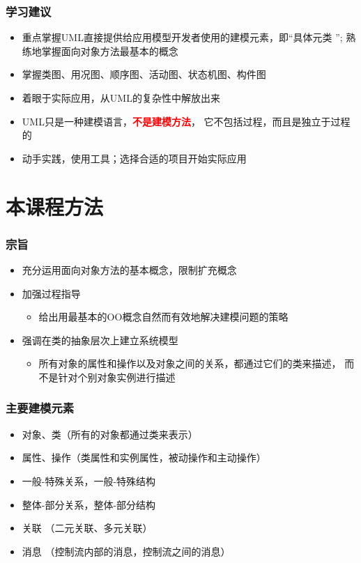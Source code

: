 \documentclass[compress]{beamer}
\begin{document}
\begin{frame}
  \frametitle{学习建议}
  \begin{itemize}
    \item 重点掌握UML直接提供给应用模型开发者使用的建模元素，即“具体元类
      ”; 熟练地掌握面向对象方法最基本的概念
    \item 掌握类图、用况图、顺序图、活动图、状态机图、构件图
    \item 着眼于实际应用，从UML的复杂性中解放出来
    \item UML只是一种建模语言，\textbf{\textcolor{red}{不是建模方法}}，
      它不包括过程，而且是独立于过程的
    \item 动手实践，使用工具；选择合适的项目开始实际应用
  \end{itemize}
\end{frame}

\section{本课程方法}

\begin{frame}
  \frametitle{宗旨}
  \begin{itemize}
    \item 充分运用面向对象方法的基本概念，限制扩充概念 
    \item 加强过程指导
      \begin{itemize}
        \item 给出用最基本的OO概念自然而有效地解决建模问题的策略
      \end{itemize}
    \item 强调在类的抽象层次上建立系统模型
      \begin{itemize}
        \item 所有对象的属性和操作以及对象之间的关系，都通过它们的类来描述，
          而不是针对个别对象实例进行描述
      \end{itemize}
  \end{itemize}

\end{frame}

\begin{frame}
  \frametitle{主要建模元素}
  \begin{itemize}
    \item 对象、类（所有的对象都通过类来表示） 
    \item 属性、操作（类属性和实例属性，被动操作和主动操作） 
    \item 一般-特殊关系，一般-特殊结构
    \item 整体-部分关系，整体-部分结构
    \item 关联 （二元关联、多元关联）
    \item 消息 （控制流内部的消息，控制流之间的消息）
  \end{itemize}
\end{frame}
\end{document}
